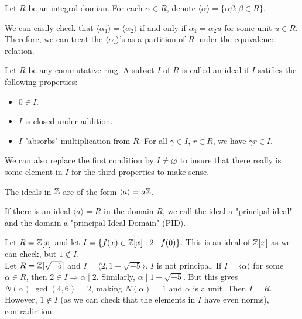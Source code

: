 \documentclass[12pt,twoside=semi,openright,numbers=noenddot]{scrbook}
\begin{document}
\begin{definition}
    Let $R$ be an integral domian. For each $\alpha \in R$, denote $\langle\alpha\rangle = \{\alpha\beta:\beta \in R\}$. 
\end{definition}
We can easily check that $\langle\alpha_1\rangle= \langle\alpha_2\rangle$ if and only if $\alpha_1 = \alpha_2 u$ for some unit $u \in R$.
Therefore, we can treat the $\langle\alpha_i\rangle$'s as a partition of $R$ under the equivalence relation.

\begin{definition}[Ideal]
    Let $R$ be any commutative ring. A subset $I$ of $R$ is called an ideal if $I$ satifies the following properties:
    \begin{itemize}
        \item $0 \in I$.
        \item $I$ is closed under addition.
        \item $I$ "absorbs" multiplication from $R$. For all $\gamma \in I$, $r \in R$, we have $\gamma r \in I$. 
    \end{itemize}
\end{definition}
We can also replace the first condition by $I \neq \varnothing $ to insure that there really is some element in $I$ for the third 
properties to make sense.
    \begin{example}
        The ideals in $\mathbb Z$ are of the form $\left\langle a \right\rangle = a\mathbb Z$.
    \end{example} 

\begin{definition}
    If there is an ideal $\langle a \rangle = R$ in the domain $R$, we call the ideal a "principal ideal" and the domain a "principal Ideal Domain" (PID).
\end{definition}
    \begin{example}
        Let $R = \mathbb Z[x]$ and let $I = \{f(x)\in \mathbb Z[x]: 2 \mid f(0) \}$. This is an ideal of $\mathbb Z[x]$ as we can check, but 
        $1 \notin I$.\\
        Let $R = \mathbb Z[\sqrt{-5}]$ and $I = \langle 2, 1+\sqrt{-5} \rangle$. $I$ is not principal. If $I = \langle \alpha \rangle$ for some $\alpha \in R$, then 
        $2 \in I \Rightarrow \alpha \mid 2$. Similarly, $\alpha \mid 1+\sqrt{-5}$. But this gives $N(\alpha)|\gcd(4,6)=2$, making $N(\alpha)=1$ and $\alpha$ is a unit.
        Then $I = R$. However, $1 \notin I$ (as we can check that the elements in $I$ have even norms), contradiction. 
    \end{example}
\end{document}
